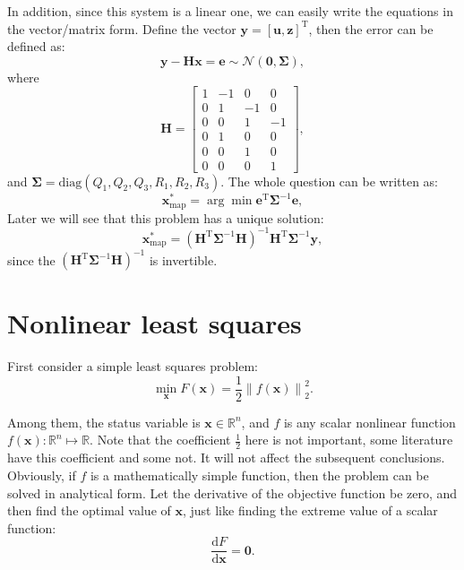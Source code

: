 In addition, since this system is a linear one, we can easily write the equations in the vector/matrix form. Define the vector $\mathbf{y}=[\mathbf{u}, \mathbf{z}]^\mathrm{T}$, then the error can be defined as:
\begin{equation}
    \mathbf{y}-\mathbf{H}\mathbf{x} = \mathbf{e} \sim \mathcal{N}(\mathbf{0}, \boldsymbol{\Sigma}),
\end{equation}
where
\begin{equation}
    \mathbf{H} = \left[ {\begin{array}{*{20}{c}}
            1&{-1}&0&0\\
            0&1&{-1}&0\\
            0&0&1&{-1}\\
            \hline
            0&1&0&0\\
            0&0&1&0\\
            0&0&0&1
    \end{array}} \right],
\end{equation}
and $\boldsymbol{\Sigma}=\mathrm{diag}(Q_1, Q_2, Q_3, R_1, R_2, R_3)$. The whole question can be written as:
\begin{equation}
    \mathbf{x}^*_{\mathrm{map}} = \arg \min \mathbf{e}^\mathrm{T} \boldsymbol{\Sigma}^{-1} \mathbf{e},
\end{equation}
Later we will see that this problem has a unique solution:
\begin{equation}
    \mathbf{x}^*_{\mathrm{map}} = (\mathbf{H}^\mathrm{T} \boldsymbol{\Sigma}^{-1} \mathbf{H})^{-1} \mathbf{H}^\mathrm{T} \boldsymbol{\Sigma}^{-1} \mathbf{y},
\end{equation}
since the $(\mathbf{H}^\mathrm{T} \boldsymbol{\Sigma}^{-1} \mathbf{H})^{-1}$ is invertible.

\section{Nonlinear least squares}
\label{sec:6.2}
First consider a simple least squares problem:
\begin{equation}
    \mathop {\min }\limits_{\mathbf{x}} F(\mathbf{x}) = \frac{1}{2}{\left\| {f\left( \mathbf{x} \right) } \right\|^2_2}.
\end{equation}

Among them, the status variable is $\mathbf{x} \in \mathbb{R}^n$, and $f$ is any scalar nonlinear function $f(\mathbf{x}): \mathbb{R}^n \mapsto \mathbb{R}$. Note that the coefficient $\frac{1}{2}$ here is not important, some literature have this coefficient and some not. It will not affect the subsequent conclusions. Obviously, if $f$ is a mathematically simple function, then the problem can be solved in analytical form. Let the derivative of the objective function be zero, and then find the optimal value of $\mathbf{x}$, just like finding the extreme value of a scalar function:
\begin{equation}
    \frac{ \mathrm{d} F}{ \mathrm{d} \mathbf{x}} = \mathbf{0}.
\end{equation}


